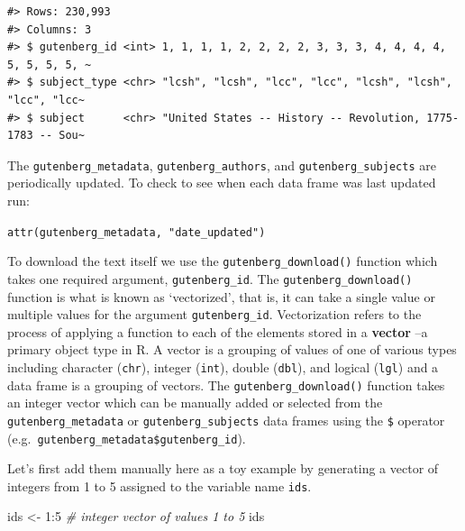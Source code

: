 \documentclass[
  letterpaper,
]{scrbook}
\newenvironment{Shaded}{\begin{snugshade}}{\end{snugshade}}
\newcommand{\CommentTok}[1]{\textcolor[rgb]{0.00,0.00,0.00}{\textit{#1}}}
\newcommand{\DecValTok}[1]{\textcolor[rgb]{0.00,0.00,0.00}{#1}}
\newcommand{\NormalTok}[1]{\textcolor[rgb]{0.00,0.00,0.00}{#1}}
\newcommand{\OtherTok}[1]{\textcolor[rgb]{0.00,0.00,0.00}{#1}}
\newcommand{\SpecialCharTok}[1]{\textcolor[rgb]{0.00,0.00,0.00}{#1}}
\begin{document}
\begin{verbatim}
#> Rows: 230,993
#> Columns: 3
#> $ gutenberg_id <int> 1, 1, 1, 1, 2, 2, 2, 2, 3, 3, 3, 4, 4, 4, 4, 5, 5, 5, 5, ~
#> $ subject_type <chr> "lcsh", "lcsh", "lcc", "lcc", "lcsh", "lcsh", "lcc", "lcc~
#> $ subject      <chr> "United States -- History -- Revolution, 1775-1783 -- Sou~
\end{verbatim}

\begin{tcolorbox}[enhanced jigsaw, title=\textcolor{quarto-callout-warning-color}{\faExclamationTriangle}\hspace{0.5em}{Tip}, breakable, colback=white, colframe=quarto-callout-warning-color-frame, bottomrule=.15mm, left=2mm, bottomtitle=1mm, colbacktitle=quarto-callout-warning-color!10!white, opacityback=0, arc=.35mm, toprule=.15mm, coltitle=black, leftrule=.75mm, opacitybacktitle=0.6, toptitle=1mm, titlerule=0mm, rightrule=.15mm]

The \texttt{gutenberg\_metadata}, \texttt{gutenberg\_authors}, and
\texttt{gutenberg\_subjects} are periodically updated. To check to see
when each data frame was last updated run:

\texttt{attr(gutenberg\_metadata,\ "date\_updated")}

\end{tcolorbox}

To download the text itself we use the \texttt{gutenberg\_download()}
function which takes one required argument, \texttt{gutenberg\_id}. The
\texttt{gutenberg\_download()} function is what is known as
`vectorized', that is, it can take a single value or multiple values for
the argument \texttt{gutenberg\_id}. Vectorization refers to the process
of applying a function to each of the elements stored in a
\textbf{vector} --a primary object type in R. A vector is a grouping of
values of one of various types including character (\texttt{chr}),
integer (\texttt{int}), double (\texttt{dbl}), and logical
(\texttt{lgl}) and a data frame is a grouping of vectors. The
\texttt{gutenberg\_download()} function takes an integer vector which
can be manually added or selected from the \texttt{gutenberg\_metadata}
or \texttt{gutenberg\_subjects} data frames using the \texttt{\$}
operator (e.g.~\texttt{gutenberg\_metadata\$gutenberg\_id}).

Let's first add them manually here as a toy example by generating a
vector of integers from 1 to 5 assigned to the variable name
\texttt{ids}.

\begin{Shaded}
\begin{Highlighting}[]
\NormalTok{ids }\OtherTok{\textless{}{-}} \DecValTok{1}\SpecialCharTok{:}\DecValTok{5} \CommentTok{\# integer vector of values 1 to 5}
\NormalTok{ids}
\end{Highlighting}
\end{Shaded}
\end{document}
